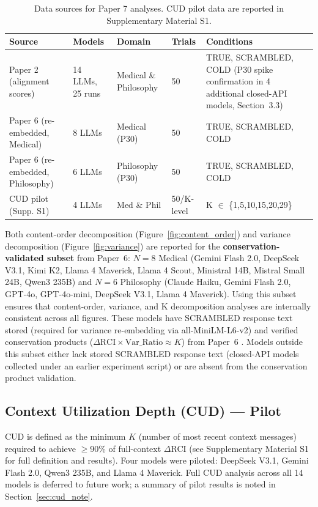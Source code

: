 \documentclass[11pt,a4paper]{article}
\begin{document}
\begin{table}[H]
\centering
\small
\begin{tabular}{p{4.0cm}p{2.5cm}p{2.5cm}p{1.5cm}p{3.5cm}}
\toprule
\textbf{Source} & \textbf{Models} & \textbf{Domain} & \textbf{Trials} & \textbf{Conditions} \\
\midrule
Paper 2 (alignment scores) & 14 LLMs, 25 runs & Medical \& Philosophy & 50 & TRUE, SCRAMBLED, COLD (P30 spike confirmation in 4 additional closed-API models, Section~3.3) \\
Paper 6 (re-embedded, Medical) & 8 LLMs & Medical (P30) & 50 & TRUE, SCRAMBLED, COLD \\
Paper 6 (re-embedded, Philosophy) & 6 LLMs & Philosophy (P30) & 50 & TRUE, SCRAMBLED, COLD \\
CUD pilot (Supp. S1) & 4 LLMs & Med \& Phil & 50/K-level & K $\in$ \{1,5,10,15,20,29\} \\
\bottomrule
\end{tabular}
\caption{Data sources for Paper 7 analyses. CUD pilot data are reported in Supplementary Material S1.}
\label{tab:data_sources}
\end{table}

\noindent Both content-order decomposition (Figure~\ref{fig:content_order}) and variance decomposition (Figure~\ref{fig:variance}) are reported for the \textbf{conservation-validated subset} from Paper~6: $N = 8$ Medical (Gemini Flash 2.0, DeepSeek V3.1, Kimi K2, Llama 4 Maverick, Llama 4 Scout, Ministral 14B, Mistral Small 24B, Qwen3 235B) and $N = 6$ Philosophy (Claude Haiku, Gemini Flash 2.0, GPT-4o, GPT-4o-mini, DeepSeek V3.1, Llama 4 Maverick). Using this subset ensures that content-order, variance, and K decomposition analyses are internally consistent across all figures. These models have SCRAMBLED response text stored (required for variance re-embedding via all-MiniLM-L6-v2) and verified conservation products ($\Delta\text{RCI} \times \text{Var\_Ratio} \approx K$) from Paper~6 \citep{laxman2026paper6}. Models outside this subset either lack stored SCRAMBLED response text (closed-API models collected under an earlier experiment script) or are absent from the conservation product validation.

\subsection{Context Utilization Depth (CUD) --- Pilot}

CUD is defined as the minimum $K$ (number of most recent context messages) required to achieve $\geq$90\% of full-context $\Delta$RCI (see Supplementary Material S1 for full definition and results). Four models were piloted: DeepSeek V3.1, Gemini Flash 2.0, Qwen3 235B, and Llama 4 Maverick. Full CUD analysis across all 14 models is deferred to future work; a summary of pilot results is noted in Section~\ref{sec:cud_note}.
\end{document}
